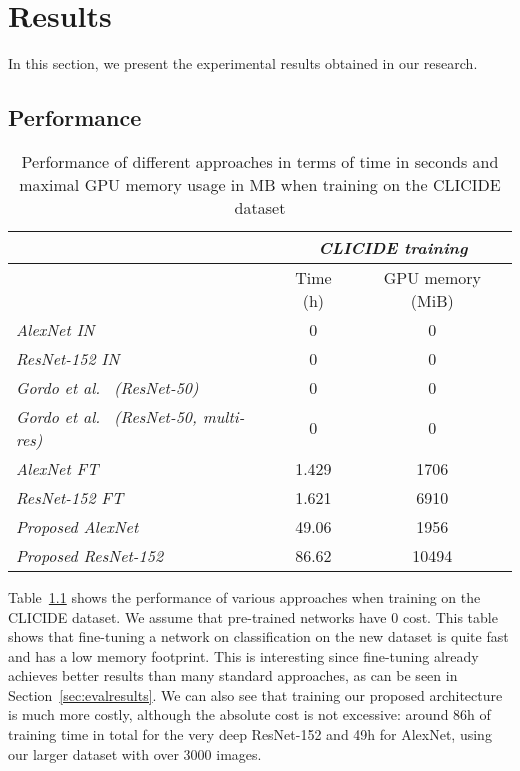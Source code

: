 
\chapter{Results}
In this section, we present the experimental results obtained in our
research.

\section{Performance}\label{sec:perfresults}

\begin{table}
\begin{tabular}{|l|c|c|}
\hline & \multicolumn{2}{c|}{\emph{CLICIDE training}}\\
\hline & Time (h) & GPU memory (MiB)\\
\hline \emph{AlexNet IN} & 0 & 0\\
\hline \emph{ResNet-152 IN} & 0 & 0\\
\hline \emph{Gordo et al.~\cite{gordo_deep_2016} (ResNet-50)} & 0 & 0\\
\hline \emph{Gordo et al.~\cite{gordo_deep_2016} (ResNet-50, multi-res)}
& 0 & 0\\
\hline \emph{AlexNet FT} & 1.429 & 1706\\
\hline \emph{ResNet-152 FT} & 1.621 & 6910\\
\hline \emph{Proposed AlexNet} & 49.06 & 1956\\
\hline \emph{Proposed ResNet-152} & 86.62 & 10494\\
\hline
\end{tabular}
\caption{Performance of different approaches in terms of time in seconds and
maximal GPU memory usage in MB when training on the CLICIDE dataset
\label{tab:perftrain}}
\end{table}

Table~\ref{tab:perftrain} shows the performance of various approaches
when training on the CLICIDE dataset. We assume that pre-trained
networks have 0 cost. This table shows that fine-tuning a network
on classification on the new dataset is quite fast and has a low memory
footprint. This is interesting since fine-tuning already achieves better
results than many standard approaches, as can be seen in
Section~\ref{sec:evalresults}.
We can also see that training our proposed architecture is much
more costly, although the absolute cost is not excessive:
around 86h of training time in total for the very deep ResNet-152
and 49h for AlexNet, using our larger dataset with over 3000 images.

